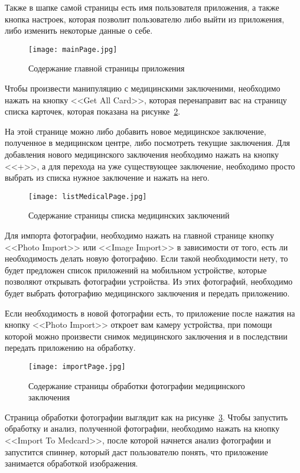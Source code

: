 Также в шапке самой страницы есть имя пользователя приложения, а также кнопка настроек, которая позволит пользователю либо выйти из приложения, либо изменить некоторые данные о себе.

\begin{figure}[ht]
\centering
  \texttt{[image: mainPage.jpg]}  
  \caption{Содержание главной страницы приложения}
  \label{fig:inst:page:main}
\end{figure}

Чтобы произвести манипуляцию с медицинскими заключеними, необходимо нажать на кнопку <<Get All Card>>, которая перенаправит вас на страницу списка карточек, которая показана на рисунке~\ref{fig:inst:page:listMedical}. 

На этой странице можно либо добавить новое медицинское заключение, полученное в медицинском центре, либо посмотреть текущие заключения. Для добавления нового медицинского заключения необходимо нажать на кнопку <<+>>, а для перехода на уже существующее заключение, необходимо просто выбрать из списка нужное заключение и нажать на него.

\begin{figure}[ht]
\centering
  \texttt{[image: listMedicalPage.jpg]}  
  \caption{Содержание страницы списка медицинских заключений}
  \label{fig:inst:page:listMedical}
\end{figure}

Для импорта фотографии, необходимо нажать на главной странице кнопку <<Photo Import>> или <<Image Import>> в зависимости от того, есть ли необходимость делать новую фотографию. Если такой необходимости нету, то будет предложен список приложений на мобильном устройстве, которые позволяют открывать фотографии устройства. Из этих фотографий, необходимо будет выбрать фотографию медицинского заключения и передать приложению.

Если необходимость в новой фотографии есть, то приложение после нажатия на кнопку <<Photo Import>> откроет вам камеру устройства, при помощи которой можно произвести снимок медицинского заключения и в последствии передать приложению на обработку.

\begin{figure}[ht]
\centering
  \texttt{[image: importPage.jpg]}  
  \caption{Содержание страницы обработки фотографии медицинского заключения}
  \label{fig:inst:page:importMedical}
\end{figure}

Страница обработки фотографии выглядит как на рисунке~\ref{fig:inst:page:importMedical}. Чтобы запустить обработку и анализ, полученной фотографии, необходимо нажать на кнопку <<Import To Medcard>>, после которой начнется анализ фотографии и запустится спиннер, который даст пользователю понять, что приложение занимается обработкой изображения.